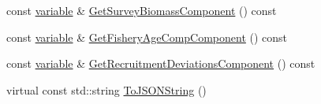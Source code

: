 \begin{DoxyCompactItemize}
\item 
const \hyperlink{structmas_1_1_area_a3fb53ebc27c5323de15a81fbfbc7c878}{variable} \& \hyperlink{structmas_1_1_area_a77ec966df7a802605411051802949e36}{Get\-Survey\-Biomass\-Component} () const 
\item 
const \hyperlink{structmas_1_1_area_a3fb53ebc27c5323de15a81fbfbc7c878}{variable} \& \hyperlink{structmas_1_1_area_a388c1fcb87b7c661edb42acf97287731}{Get\-Fishery\-Age\-Comp\-Component} () const 
\item 
const \hyperlink{structmas_1_1_area_a3fb53ebc27c5323de15a81fbfbc7c878}{variable} \& \hyperlink{structmas_1_1_area_ab1672695b4cfbe7a7003e37f49f36d5d}{Get\-Recruitment\-Deviations\-Component} () const 
\item 
virtual const std\-::string \hyperlink{structmas_1_1_area_a763dda5093e54bf8a83ba61e8b4da078}{To\-J\-S\-O\-N\-String} ()
\end{DoxyCompactItemize}
